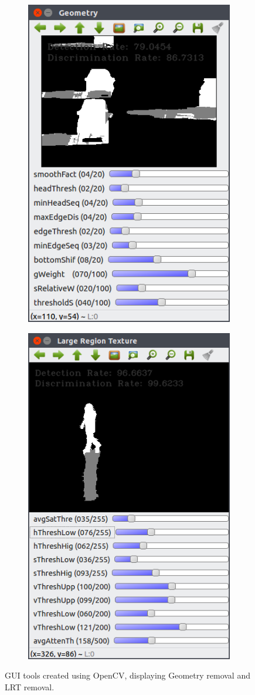 \documentclass[12pt]{report}
\begin{document}
\begin{figure}
\centering
\begin{subfigure}{.49\linewidth}
  \centering
 \includegraphics[width=.7\linewidth]{figures/geo_highway1_default.png}
\end{subfigure}
\hfill
\begin{subfigure}{.49\linewidth}
  \centering
 \includegraphics[width=.7\linewidth]{figures/lr_caviar_default.png}
\end{subfigure}
\caption{GUI tools created using OpenCV, displaying Geometry removal and LRT removal.}
\label{fig:guitools}
\end{figure}
\end{document}
